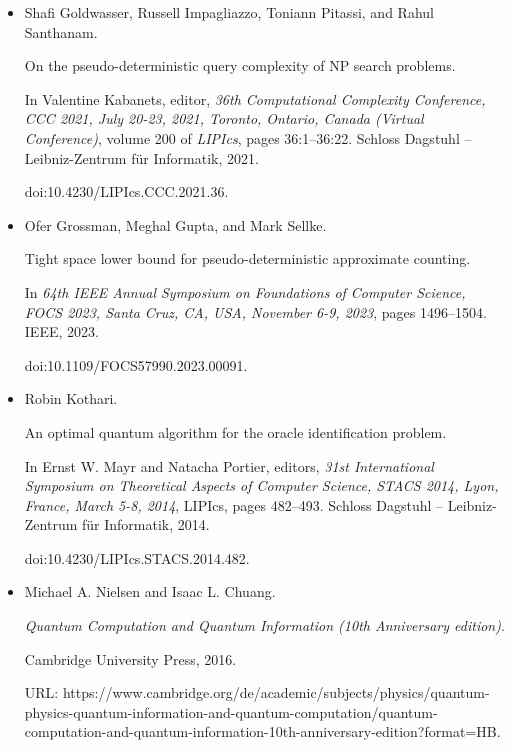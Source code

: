 \documentclass[10pt,a4paper]{article}
\begin{document}
\begin{itemize}
\item[] 
[18]

Shafi Goldwasser, Russell Impagliazzo, Toniann Pitassi, and Rahul Santhanam.


On the pseudo-deterministic query complexity of NP search problems.


In Valentine Kabanets, editor, \emph{36th Computational Complexity
Conference, CCC 2021, July 20-23, 2021, Toronto, Ontario, Canada (Virtual
Conference)}, volume 200 of \emph{LIPIcs}, pages 36:1–36:22. Schloss Dagstuhl
– Leibniz-Zentrum für Informatik, 2021.


doi:10.4230/LIPIcs.CCC.2021.36.





\item[] 
[19]

Ofer Grossman, Meghal Gupta, and Mark Sellke.


Tight space lower bound for pseudo-deterministic approximate
counting.


In \emph{64th IEEE Annual Symposium on Foundations of Computer
Science, FOCS 2023, Santa Cruz, CA, USA, November 6-9, 2023}, pages
1496–1504. IEEE, 2023.


doi:10.1109/FOCS57990.2023.00091.





\item[] 
[20]

Robin Kothari.


An optimal quantum algorithm for the oracle identification problem.


In Ernst W. Mayr and Natacha Portier, editors, \emph{31st
International Symposium on Theoretical Aspects of Computer Science, STACS
2014, Lyon, France, March 5-8, 2014}, LIPIcs, pages 482–493. Schloss
Dagstuhl – Leibniz-Zentrum für Informatik, 2014.


doi:10.4230/LIPIcs.STACS.2014.482.





\item[] 
[21]

Michael A. Nielsen and Isaac L. Chuang.


\emph{Quantum Computation and Quantum Information (10th Anniversary
edition)}.


Cambridge University Press, 2016.


URL:
https://www.cambridge.org/de/academic/subjects/physics/quantum-physics-quantum-information-and-quantum-computation/quantum-computation-and-quantum-information-10th-anniversary-edition?format=HB.






\end{itemize}
\end{document}
